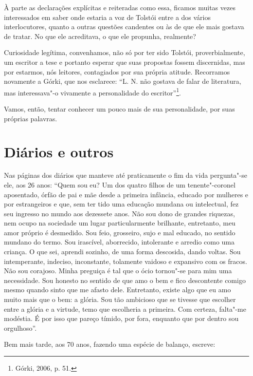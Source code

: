 À parte as declarações explícitas e reiteradas como essa, ficamos muitas
vezes interessados em saber onde estaria a voz de Tolstói entre a dos
vários interlocutores, quanto a outras questões candentes ou às de que
ele mais gostava de tratar. No que ele acreditava, o que ele propunha,
realmente?

Curiosidade legítima, convenhamos, não só por ter sido Tolstói,
proverbialmente, um escritor a tese e portanto esperar que suas
propostas fossem discernidas, mas por estarmos, nós leitores,
contagiados por sua própria atitude. Recorramos novamente a
Górki, que nos esclarece: ``L. N. não gostava
de falar de literatura, mas interessava"-o vivamente a personalidade do
escritor''\footnote{Górki, 2006, p. 51.}.

Vamos, então, tentar conhecer um pouco mais de sua personalidade, por
suas próprias palavras.

\chapter{Diários e outros}

Nas páginas dos diários que manteve até praticamente o fim da vida
pergunta"-se ele, aos 26 anos: ``Quem sou eu? Um dos quatro filhos de um
tenente"-coronel aposentado, órfão de pai e mãe desde a primeira
infância, educado por mulheres e por estrangeiros e que, sem ter tido
uma educação mundana ou intelectual, fez seu ingresso no mundo aos
dezessete anos. Não sou dono de grandes riquezas, nem ocupo na sociedade
um lugar particularmente brilhante, entretanto, meu amor próprio é
desmedido. Sou feio, grosseiro, sujo e mal educado, no sentido mundano
do termo. Sou irascível, aborrecido, intolerante e arredio como uma
criança. O que sei, aprendi sozinho, de uma forma descosida, dando
voltas. Sou intemperante, indeciso, inconstante, tolamente vaidoso e
expansivo com os fracos. Não sou corajoso. Minha preguiça é tal que o
ócio tornou"-se para mim uma necessidade. Sou honesto no sentido de que
amo o bem e fico descontente comigo mesmo quando sinto que me afasto
dele. Entretanto, existe algo que eu amo muito mais que o bem: a glória.
Sou tão ambicioso que se tivesse que escolher entre a glória e a
virtude, temo que escolheria a primeira. Com certeza, falta"-me modéstia.
É por isso que pareço tímido, por fora, enquanto que por dentro sou
orgulhoso''.

Bem mais tarde, aos 70 anos, fazendo uma espécie de balanço, escreve:

